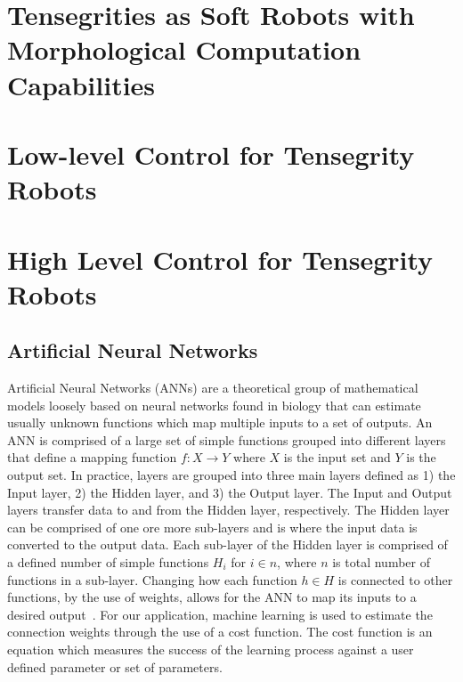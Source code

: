 \section{Tensegrities as Soft Robots with Morphological Computation Capabilities}
\label{sec:robots}


\section{Low-level Control for Tensegrity Robots}
\label{sec:control}


\section{High Level Control for Tensegrity Robots}
\label{sec:NN_and_Planning_overview}

\subsection{Artificial Neural Networks}
\label{sec:ann}
Artificial Neural Networks (ANNs) are a theoretical group of mathematical models loosely based on neural networks found in biology that can estimate usually unknown functions which map multiple inputs to a set of outputs.
An ANN is comprised of a large set of simple functions grouped into different layers that define a mapping function \(f:X \to Y\) where \(X\) is the input set and \(Y\) is the output set.
In practice, layers are grouped into three main layers defined as 1) the Input layer, 2) the Hidden layer, and 3) the Output layer.
The Input and Output layers transfer data to and from the Hidden layer, respectively.
The Hidden layer can be comprised of one ore more sub-layers and is where the input data is converted to the output data.
Each sub-layer of the Hidden layer is comprised of a defined number of simple functions \(H_{i}\) for \(i \in n\), where \(n\) is total number of functions in a sub-layer.
Changing how each function \(h \in H\) is connected to other functions, by the use of weights, allows for the ANN to map its inputs to a desired output~\cite{lippmann1987introduction}. For our application, machine learning is used to estimate the connection weights through the use of a cost function.
The cost function is an equation which measures the success of the learning process against a user defined parameter or set of parameters.

